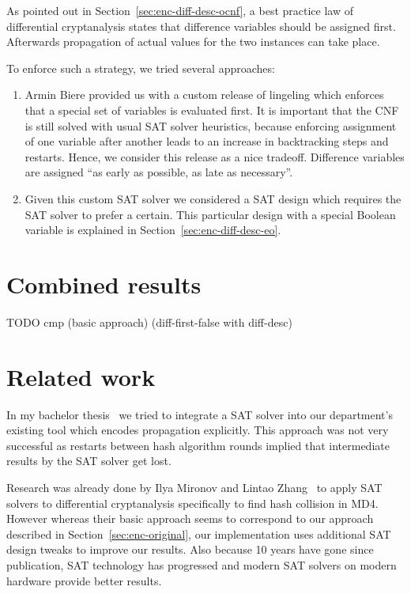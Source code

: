 \newpage

As pointed out in Section~\ref{sec:enc-diff-desc-ocnf}, a best practice law of
differential cryptanalysis states that difference variables should be
assigned first. Afterwards propagation of actual values for the two
instances can take place.

To enforce such a strategy, we tried several approaches:
\begin{enumerate}
  \item
    Armin Biere provided us with a custom release of lingeling
    which enforces that a special set of variables is evaluated
    first. It is important that the CNF is still solved
    with usual SAT solver heuristics, because enforcing
    assignment of one variable after another leads to an increase
    in backtracking steps and restarts. Hence, we consider this
    release as a nice tradeoff. Difference variables are assigned
    \enquote{as early as possible, as late as necessary}.
  \item
    Given this custom SAT solver we considered a SAT design which
    requires the SAT solver to prefer a certain. This particular
    design with a special Boolean variable is explained in
    Section~\ref{sec:enc-diff-desc-eo}.
\end{enumerate}


\section{Combined results}
%


TODO cmp (basic approach) (diff-first-false with diff-desc)






\section{Related work}
\label{sec:results-related}
%
In my bachelor thesis~\cite{bach} we tried to integrate a SAT solver into
our department's existing tool which encodes propagation explicitly. This approach
was not very successful as restarts between hash algorithm rounds implied that
intermediate results by the SAT solver get lost.

Research was already done by Ilya Mironov and Lintao Zhang~\cite{mironov2006applications}
to apply SAT solvers to differential cryptanalysis specifically to find hash collision
in MD4. However whereas their basic approach seems to correspond to our approach described
in Section~\ref{sec:enc-original}, our implementation uses additional SAT design tweaks
to improve our results. Also because 10 years have gone since publication, SAT technology
has progressed and modern SAT solvers on modern hardware provide better results.



